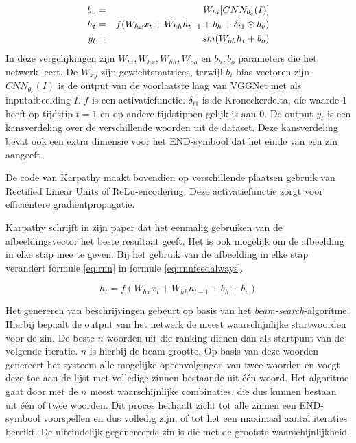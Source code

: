 \begin{eqnarray}
     \vspace{-3mm}
     \label{eq:rnnstart}
     b_v & = & W_{hi} [CNN_{\theta_c}(I)] \\
     \label{eq:rnn}
     h_t & = & f(W_{hx} x_{t} + W_{hh} h_{t-1} + b_h + \delta_{t1} \odot b_v) \\
     y_t & = & sm( W_{oh} h_t + b_o)
     \label{eq:rnnend}
\end{eqnarray}
In deze vergelijkingen zijn $W_{hi}, W_{hx}, W_{hh}, W_{oh}$ en $b_h, b_o$ parameters die het netwerk leert. De $W_{xy}$ zijn gewichtsmatrices, terwijl $b_i$ bias vectoren zijn. $CNN_{\theta_c}(I)$ is de output van de voorlaatste laag van VGGNet met als inputafbeelding $I$. $f$ is een activatiefunctie. $\delta_{t1}$ is de Kroneckerdelta, die waarde $1$ heeft op tijdstip $t=1$ en op andere tijdstippen gelijk is aan $0$. De output $y_t$ is een kansverdeling over de verschillende woorden uit de dataset. Deze kansverdeling bevat ook een extra dimensie voor het END-symbool dat het einde van een zin aangeeft. 

De code van Karpathy maakt bovendien op verschillende plaatsen gebruik van Rectified Linear Units of ReLu-encodering. Deze activatiefunctie zorgt voor effici\"entere gradi\"entpropagatie.

Karpathy schrijft in zijn paper dat het eenmalig gebruiken van de afbeeldingsvector het beste resultaat geeft. Het is ook mogelijk om de afbeelding in elke stap mee te geven. Bij het gebruik van de afbeelding in elke stap verandert formule \eqref{eq:rnn} in formule \eqref{eq:rnnfeedalways}.

\begin{equation}
     h_t = f(W_{hx} x_{t} + W_{hh} h_{t-1} + b_h + b_v)
\label{eq:rnnfeedalways}
\end{equation}

Het genereren van beschrijvingen gebeurt op basis van het \emph{beam-search}-algoritme. Hierbij bepaalt de output van het netwerk de meest waarschijnlijke startwoorden voor de zin. De beste $n$ woorden uit die ranking dienen dan als startpunt van de volgende iteratie. $n$ is hierbij de beam-grootte. Op basis van deze woorden genereert het systeem alle mogelijke opeenvolgingen van twee woorden en voegt deze toe aan de lijst met volledige zinnen bestaande uit \'e\'en woord. Het algoritme gaat door met de $n$ meest waarschijnlijke combinaties, die dus kunnen bestaan uit \'e\'en of twee woorden. Dit proces herhaalt zicht tot alle zinnen een END-symbool voorspellen en dus volledig zijn, of tot het een maximaal aantal iteraties bereikt. De uiteindelijk gegenereerde zin is die met de grootste waarschijnlijkheid.


